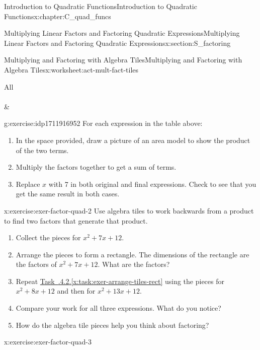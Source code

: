 \documentclass[oneside,10pt,]{book}
\makeatletter
\newcommand{\xreffont}{\relax}
\numberwithin{equation}{chapter}
\newcommand{\hrulethin}  {\noalign{\hrule height 0.04em}}
\newcommand{\tablecelllines}[3]%
{\begin{tabular}[#2]{@{}#1@{}}#3\end{tabular}}
\makeatother
\begin{document}
\begin{chapterptx}{Introduction to Quadratic Functions}{}{Introduction to Quadratic Functions}{}{}{x:chapter:C_quad_funcs}
\begin{sectionptx}{Multiplying Linear Factors and Factoring Quadratic Expressions}{}{Multiplying Linear Factors and Factoring Quadratic Expressions}{}{}{x:section:S_factoring}
\begin{worksheet-subsection}{Multiplying and Factoring with Algebra Tiles}{}{Multiplying and Factoring with Algebra Tiles}{}{}{x:worksheet:act-mult-fact-tiles}
\begin{center}
{\begin{tabular}{All}
{{\\
\\
}
}&\multicolumn{1}{lA}{\tablecelllines{l}{m}
{\((2x + 1)(x - 2)\)~~~~~~\\
\\
\\
\\
\\
\\
}
}\tabularnewline\hrulethin
\end{tabular}
}%
\end{center}%
\begin{divisionexercise}{1}{}{}{g:exercise:idp1711916952}%
For each expression in the table above:%
\begin{enumerate}[font=\bfseries,label=(\alph*),ref=\alph*]
\item{}In the space provided, draw a picture of an area model to show the product of the two terms.%
\item{}Multiply the factors together to get a sum of terms.%
\item{}Replace \(x\) with 7 in both original and final expressions. Check to see that you get the same result in both cases.%
\end{enumerate}
\end{divisionexercise}%
\begin{divisionexercise}{2}{}{}{x:exercise:exer-factor-quad-2}%
Use algebra tiles to work backwards from a product to find two factors that generate that product.%
\begin{enumerate}[font=\bfseries,label=(\alph*),ref=\alph*]
\item{}Collect the pieces for \(x^2 + 7x + 12\).%
\item\label{x:task:exer-arrange-tiles-rect}Arrange the pieces to form a rectangle. The dimensions of the rectangle are the factors of \(x^2 + 7x + 12\). What are the factors?%
\item{}Repeat \hyperref[x:task:exer-arrange-tiles-rect]{Task~{\xreffont 4.3.4.2}.{\xreffont\ref{x:task:exer-arrange-tiles-rect}}} using the pieces for \(x^2 + 8x + 12\) and then for \(x^2 + 13x + 12\).%
\item{}Compare your work for all three expressions. What do you notice?%
\item{}How do the algebra tile pieces help you think about factoring?%
\end{enumerate}
\end{divisionexercise}%
\begin{divisionexercise}{3}{}{}{x:exercise:exer-factor-quad-3}%

\end{divisionexercise}
\end{worksheet-subsection}
\end{sectionptx}
\end{chapterptx}
\end{document}
